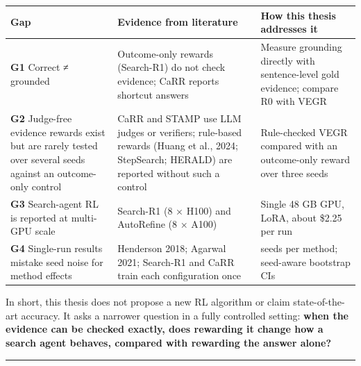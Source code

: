 {\def\LTcaptype{none} %
\begin{longtable}[]{@{}
  >{\raggedright\arraybackslash}p{}
  >{\raggedright\arraybackslash}p{}
  >{\raggedright\arraybackslash}p{}@{}}
\toprule\noalign{}
\begin{minipage}[b]{\linewidth}\raggedright
Gap
\end{minipage} & \begin{minipage}[b]{\linewidth}\raggedright
Evidence from literature
\end{minipage} & \begin{minipage}[b]{\linewidth}\raggedright
How this thesis addresses it
\end{minipage} \\
\midrule\noalign{}
\endhead
\bottomrule\noalign{}
\endlastfoot
\textbf{G1} Correct ≠ grounded & Outcome-only rewards (Search-R1) do not
check evidence; CaRR reports shortcut answers & Measure grounding
directly with sentence-level gold evidence; compare R0 with VEGR \\
\textbf{G2} Judge-free evidence rewards exist but are rarely tested over
several seeds against an outcome-only control & CaRR and STAMP use LLM
judges or verifiers; rule-based rewards (Huang et al., 2024; StepSearch;
HERALD) are reported without such a control & Rule-checked VEGR compared
with an outcome-only reward over three seeds \\
\textbf{G3} Search-agent RL is reported at multi-GPU scale & Search-R1
(8 × H100) and AutoRefine (8 × A100) & Single 48 GB GPU, LoRA, about
\$2.25 per run \\
\textbf{G4} Single-run results mistake seed noise for method effects &
Henderson 2018; Agarwal 2021; Search-R1 and CaRR train each
configuration once & 3 seeds per method; seed-aware bootstrap CIs \\
\end{longtable}
}

In short, this thesis does not propose a new RL algorithm or claim
state-of-the-art accuracy. It asks a narrower question in a fully
controlled setting: \textbf{when the evidence can be checked exactly,
does rewarding it change how a search agent behaves, compared with
rewarding the answer alone?}

\begin{center}\rule{0.5\linewidth}{0.5pt}\end{center}

